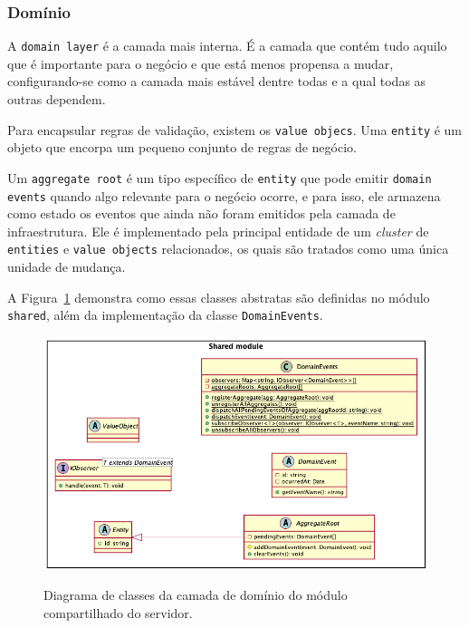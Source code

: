 \subsubsection{Domínio}

A \texttt{domain layer} é a camada mais interna. É a camada que contém tudo aquilo que é importante para o negócio e que está menos propensa a mudar, configurando-se como a camada mais estável dentre todas e a qual todas as outras dependem.

Para encapsular regras de validação, existem os \texttt{value objecs}. Uma \texttt{entity} é um objeto que encorpa um pequeno conjunto de regras de negócio.

Um \texttt{aggregate root} é um tipo específico de \texttt{entity} que pode emitir \texttt{domain events} quando algo relevante para o negócio ocorre, e para isso, ele armazena como estado os eventos que ainda não foram emitidos pela camada de infraestrutura. Ele é implementado pela principal entidade de um \emph{cluster} de \texttt{entities} e \texttt{value objects} relacionados, os quais são tratados como uma única unidade de mudança.

A Figura~\ref{f.system_server_shared-module_domain} demonstra como essas classes abstratas são definidas no módulo \texttt{shared}, além da implementação da classe \texttt{DomainEvents}.

\begin{figure}[htbp]
	\caption{\small Diagrama de classes da camada de domínio do módulo compartilhado do servidor.}
	\centering
	\includegraphics[width=\textwidth]{../diagrams/out/system_server_shared-module_domain.png}
	\label{f.system_server_shared-module_domain}
\end{figure}

